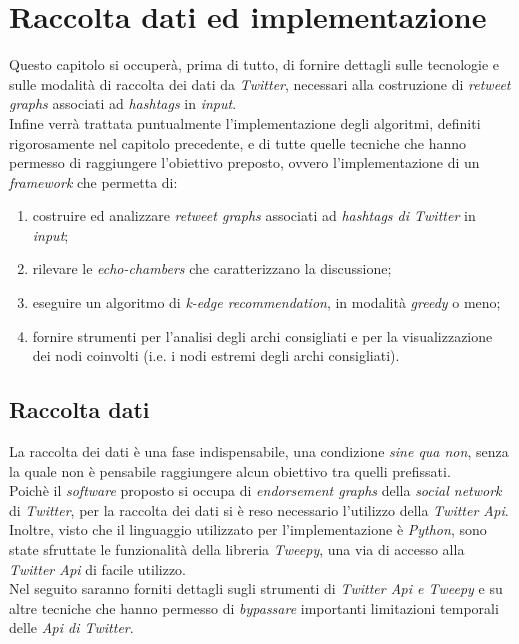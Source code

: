 \chapter{Raccolta dati ed implementazione}
\label{chap:implementazione}

Questo capitolo si occuperà, prima di tutto, di fornire dettagli sulle tecnologie e sulle modalità di raccolta dei dati da \textit{Twitter}, necessari alla costruzione di \textit{retweet graphs} associati ad \textit{hashtags} in \textit{input}.
\\Infine verrà trattata puntualmente l'implementazione degli algoritmi, definiti rigorosamente nel capitolo precedente, e di tutte quelle tecniche che hanno permesso di raggiungere l'obiettivo preposto, ovvero l'implementazione di un \textit{framework} che permetta di:
\begin{enumerate}
\item costruire ed analizzare \textit{retweet graphs} associati ad \textit{hashtags di Twitter} in \textit{input};
\item rilevare le \textit{echo-chambers} che caratterizzano la discussione;
\item eseguire un algoritmo di \textit{k-edge recommendation}, in modalità \textit{greedy} o meno;
\item fornire strumenti per l'analisi degli archi consigliati e per la visualizzazione dei nodi coinvolti (i.e. i nodi estremi degli archi consigliati).  
\end{enumerate}

\section{Raccolta dati}
La raccolta dei dati è una fase indispensabile, una condizione \textit{sine qua non}, senza la quale non è pensabile raggiungere alcun obiettivo tra quelli prefissati.
\\Poichè il \textit{software} proposto si occupa di \textit{endorsement graphs} della \textit{social network} di \textit{Twitter}, per la raccolta dei dati si è reso necessario l'utilizzo della \textit{Twitter Api}. Inoltre, visto che il linguaggio utilizzato per l'implementazione è \textit{Python}, sono state sfruttate le funzionalità della libreria \textit{Tweepy}, una via di accesso alla \textit{Twitter Api} di facile utilizzo. 
\\Nel seguito saranno forniti dettagli sugli strumenti di \textit{Twitter Api e Tweepy} e su altre tecniche che hanno permesso di \textit{bypassare} importanti limitazioni temporali delle \textit{Api di Twitter}.  

